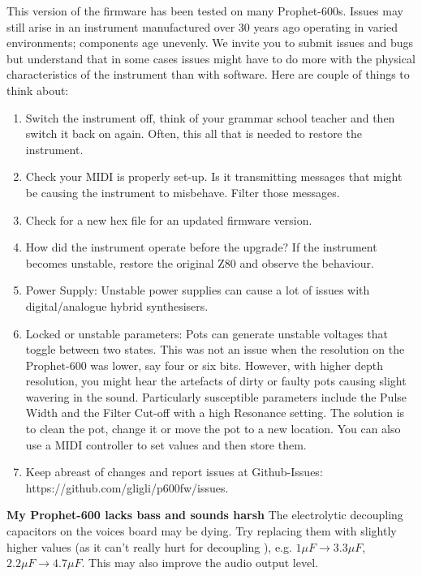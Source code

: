 This version of the firmware has been tested on many Prophet-600s.  Issues may still arise in an instrument manufactured over 30 years ago operating in varied environments; components age unevenly.  We invite you to submit issues and bugs but understand that in some cases issues might have to do more with the physical characteristics of the instrument than with software.  Here are couple of things to think about:

\begin{enumerate}
  \setlength\itemsep{0cm}
  \item Switch the instrument off, think of your grammar school teacher and then switch it back on again. Often, this all that is needed to restore the instrument. 
  \item Check your MIDI is properly set-up.  Is it transmitting messages that might be causing the instrument to misbehave.  Filter those messages.
  \item Check for a new hex file for an updated firmware version.
  \item How did the instrument operate before the upgrade?  If the instrument becomes unstable, restore the original Z80 and observe the behaviour.
  \item Power Supply: Unstable power supplies can cause a lot of issues with digital/analogue hybrid synthesisers.
  \item Locked or unstable parameters: Pots can generate unstable voltages that toggle between two states.  This was not an issue when the resolution on the Prophet-600 was lower, say four or six bits.  However, with higher depth resolution, you might hear the artefacts of dirty or faulty pots causing slight wavering in the sound.  Particularly susceptible parameters include the Pulse Width and the Filter Cut-off with a high Resonance setting.  The solution is to clean the pot, change it or move the pot to a new location.  You can also use a MIDI controller to set values and then store them.   
  \item Keep abreast of changes and report issues at Github-Issues: https://github.com/gligli/p600fw/issues. 
    
\end{enumerate}

\textbf{My Prophet-600 lacks bass and sounds harsh}
The electrolytic decoupling capacitors on the voices board may be dying. Try replacing them with slightly higher values (as it can't really hurt for decoupling ), 
e.g. $1\mu F \to 3.3\mu F$, $2.2\mu F \to 4.7\mu F$. This may also improve the audio output level.
